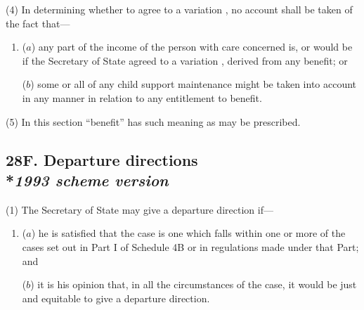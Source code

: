 \documentclass[12pt,a4paper]{article}
\begin{document}
(4) In determining 
whether to agree to a variation%
, no account shall be taken of the fact that—
\begin{enumerate}\item[]
($a$) any part of the income of the person with care concerned is, or would be if 
the 
Secretary of State  %
agreed to a variation%
, derived from any benefit; or

($b$) some or all of any child support maintenance might be taken into account in any manner in relation to any entitlement to benefit.
\end{enumerate}

(5) In this section “benefit” has such meaning as may be prescribed.



\subsection[28F. Departure directions --- \emph{1993 scheme version}]{28F. Departure directions\\*\emph{1993 scheme version}}

(1) The Secretary of State may give a departure direction if—
\begin{enumerate}\item[]
($a$) he is satisfied that the case is one which falls within one or more of the cases set out in Part I of Schedule 4B or in regulations made under that Part; and

($b$) it is his opinion that, in all the circumstances of the case, it would be just and equitable to give a departure direction.
\end{enumerate}
\end{document}
